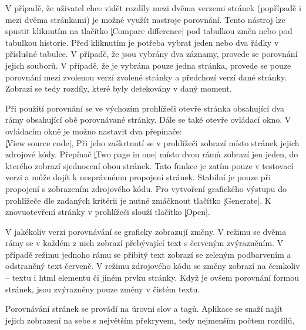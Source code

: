 V případě, že uživatel chce vidět rozdíly mezi dvěma verzemi stránek (popřípadě i mezi dvěma stránkami) je možné využít nastroje porovnání.
Tento nástroj lze spustit kliknutím na tlačítko \c|Compare difference| pod tabulkou změn nebo pod tabulkou historie.
Před kliknutím je potřeba vybrat jeden nebo dva řádky v příslušné tabulce.
V případě, že jsou vybrány dva záznamy, provede se porovnání jejich souborů.
V případě, že je vybrána pouze jedna stránka, provede se pouze porovnání mezi zvolenou verzí zvolené stránky a předchozí verzí dané stránky.
Zobrazí se tedy rozdíly, které byly detekovány v daný moment.

Při použití porovnání se ve výchozím prohlížeči otevře stránka obsahující dva rámy obsahující obě porovnávané stránky.
Dále se také otevře ovládací okno.
V ovládacím okně je možno nastavit dva přepínače:\\
\c|View source code|, Při jeho zaškrtnutí se v prohlížeči zobrazí místo stránek jejich zdrojové kódy.
Přepínač \c|Two page in one| místo dvou rámů zobrazí jen jeden, do kterého zobrazí sjednocení obou stránek.
Tato funkce je zatím pouze v testovací verzi a může dojít k nesprávnému propojení stránek. Stabilní je pouze při propojení s zobrazením zdrojového kódu.
Pro vytvoření grafického výstupu do prohlížeče dle zadaných kritérii je nutné zmáčknout tlačítko \c|Generate|.
K znovuotevření stránky v prohlížeči slouží tlačítko \c|Open|.

V jakékoliv verzi porovnávání se graficky zobrazují změny.
V režimu se dvěma rámy se v každém z nich zobrazí přebývající text s červeným zvýrazněním.
V případě režimu jednoho rámu se přibitý text zobrazí se zeleným podbarvením a odstraněný text červeně.
V režimu zdrojového kódu se změny zobrazí na čemkoliv -- textu i html elementu či jiném prvku stránky.
Když je ovšem porovnání formou stránek, jsou zvýrazněny pouze změny v čistém textu.

Porovnávání stránek se provádí na úrovni slov a tagů.
Aplikace se snaží najít jejich zobrazení na sebe s největším překryvem,  tedy nejmenším počtem rozdílů,
